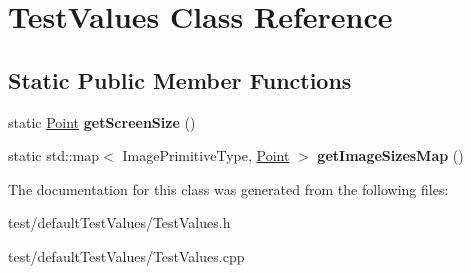 \hypertarget{classTestValues}{}\section{Test\+Values Class Reference}
\label{classTestValues}
\subsection*{Static Public Member Functions}
\begin{DoxyCompactItemize}
\item 
static \hyperlink{classPoint}{Point} {\bfseries get\+Screen\+Size} ()\hypertarget{classTestValues_aafb8fde756f6c3142e5a615cf5fe17fa}{}\label{classTestValues_aafb8fde756f6c3142e5a615cf5fe17fa}

\item 
static std\+::map$<$ Image\+Primitive\+Type, \hyperlink{classPoint}{Point} $>$ {\bfseries get\+Image\+Sizes\+Map} ()\hypertarget{classTestValues_a7710f20f9e1925e67cd3618cdfa084ed}{}\label{classTestValues_a7710f20f9e1925e67cd3618cdfa084ed}

\end{DoxyCompactItemize}


The documentation for this class was generated from the following files\+:\begin{DoxyCompactItemize}
\item 
test/default\+Test\+Values/Test\+Values.\+h\item 
test/default\+Test\+Values/Test\+Values.\+cpp\end{DoxyCompactItemize}
